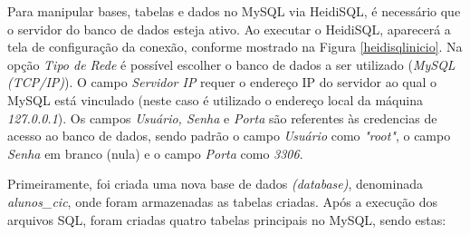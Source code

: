 Para manipular bases, tabelas e dados no MySQL via HeidiSQL, é necessário que o servidor do banco de dados esteja ativo. Ao executar o HeidiSQL, aparecerá a tela de configuração da conexão, conforme mostrado na Figura \ref{heidisqlinicio}. Na opção \textit{Tipo de Rede} é possível escolher o banco de dados a ser utilizado (\textit{MySQL (TCP/IP)}). O campo \textit{Servidor IP} requer o endereço IP do servidor ao qual o MySQL está vinculado (neste caso é utilizado o endereço local da máquina \textit{127.0.0.1}). Os campos \textit{Usuário, Senha} e \textit{Porta} são referentes às credencias de acesso ao banco de dados, sendo padrão o campo \textit{Usuário} como \textit{"root"}, o campo \textit{Senha} em branco (nula) e o campo \textit{Porta} como \textit{3306}.

Primeiramente, foi criada uma nova base de dados \textit{(database)}, denominada \textit{alunos\_cic}, onde foram armazenadas as tabelas criadas. Após a execução dos arquivos SQL, foram criadas quatro tabelas principais no MySQL, sendo estas:
